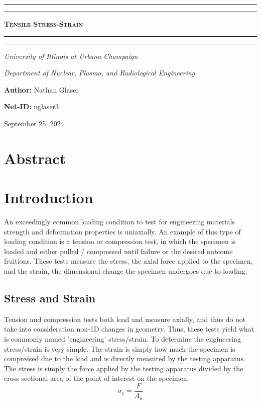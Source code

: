 \documentclass{article}
\begin{document}
\begin{titlepage}

\centering
\scshape
\vspace{\baselineskip}

%
\rule{\textwidth}{1.6pt}\vspace*{-\baselineskip}\vspace*{2pt}
\rule{\textwidth}{0.4pt}

{\Huge \textbf{\textsc{ Tensile Stress-Strain \\
\vspace{15pt}}}}

\rule{\textwidth}{0.4pt}\vspace*{-\baselineskip}\vspace{3.2pt}
\rule{\textwidth}{1.6pt}\vspace{6pt}
\centerline{\textit{University of Illinois at Urbana-Champaign}} 
\centerline{\textit{Department of Nuclear, Plasma, and Radiological Engineering}}
\vspace{1.5\baselineskip}


\large \centerline{\textbf{Author:} Nathan Glaser}
\large \centerline{\textbf{Net-ID:} nglaser3}
\quad

\vfill
\large \centerline{September 25, 2024}
%
\end{titlepage}

\tableofcontents
\newpage
{}

\section{Abstract}

\newpage
\section{Introduction}
An exceedingly common loading condition to test for engineering materials strength and deformation properties is uniaxially. An example of this type of loading condition is a tension or compression test, in which the specimen is loaded and either pulled / compressed until failure or the desired outcome fruitions. These tests measure the stress, the axial force applied to the specimen, and the strain, the dimensional change the specimen undergoes due to loading.
\subsection{Stress and Strain}
Tension and compression tests both load and measure axially, and thus do not take into consideration non-1D changes in geometry. Thus, these tests yield what is commonly named 'engineering' stress/strain. To determine the engineering stress/strain is very simple. The strain is simply how much the specimen is compressed due to the load and is directly measured by the testing apparatus. The stress is simply the force applied by the testing apparatus divided by the cross sectional area of the point of interest on the specimen. 
\begin{equation}
    \sigma_e = \frac{F}{A_o}
    \label{eq:engstress}
\end{equation}
\end{document}
